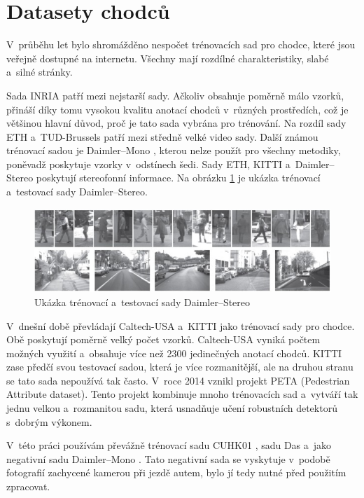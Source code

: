 \section{Datasety chodců} 
V~průběhu let bylo shromážděno nespočet trénovacích sad pro chodce, které jsou veřejně dostupné na internetu. Všechny mají rozdílné charakteristiky, slabé a~silné stránky. 

Sada INRIA \cite{inria} patří mezi nejstarší sady. Ačkoliv obsahuje poměrně málo vzorků, přináší díky tomu vysokou kvalitu anotací chodců v~různých prostředích, což je většinou hlavní důvod, proč je tato sada vybrána pro trénování. Na rozdíl sady ETH \cite{eth} a~TUD-Brussels \cite{tudbrussels} patří mezi středně velké video sady. Další známou trénovací sadou je Daimler--Mono \cite{daimler}, kterou nelze použít pro všechny metodiky, poněvadž poskytuje vzorky v~odstínech šedi. Sady ETH, KITTI \cite{kitti} a~Daimler--Stereo \cite{daimlerstereo} poskytují stereofonní informace. Na obrázku \ref{fig:daimler_stereo} je ukázka trénovací a~testovací sady Daimler--Stereo. 

\begin{figure}[H]
\centering
\includegraphics[width=16cm]{figures/daimler_stereo}
\caption{Ukázka trénovací a~testovací sady Daimler--Stereo \cite{daimlerstereo}}
\label{fig:daimler_stereo}
\end{figure}

V~dnešní době převládají Caltech-USA \cite{caltech} a~KITTI jako trénovací sady pro chodce. Obě poskytují poměrně velký počet vzorků. Caltech-USA vyniká počtem možných využití a~obsahuje více než 2300 jedinečných anotací chodců. KITTI zase předčí svou testovací sadou, která je více rozmanitější, ale na druhou stranu se tato sada nepoužívá tak často. V~roce 2014 vznikl projekt PETA (Pedestrian Attribute dataset)\cite{peta}. Tento projekt kombinuje mnoho trénovacích sad a~vytváří tak jednu velkou a~rozmanitou sadu, která usnadňuje učení robustních detektorů s~dobrým výkonem.

V~této práci používám převážně trénovací sadu CUHK01 \cite{cuhk}, sadu Das \cite{sudipdas} a~jako negativní sadu Daimler--Mono \cite{daimler}. Tato negativní sada se vyskytuje v~podobě fotografií zachycené kamerou při jezdě autem, bylo jí tedy nutné před použitím zpracovat. 

